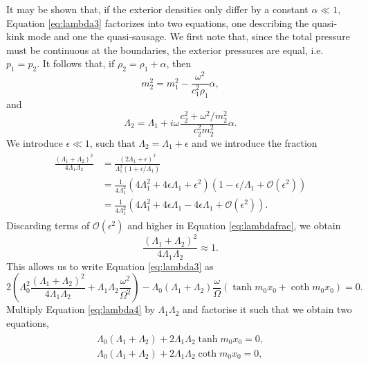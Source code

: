 It may be shown that, if the exterior densities only differ by a constant $\alpha \ll 1$, Equation \eqref{eq:lambda3} factorizes into two equations, one describing the quasi-kink mode and one the quasi-sausage.
We first note that, since the total pressure must be continuous at the boundaries, the exterior pressures are equal, i.e. $p_1 = p_2$.
It follows that, if $\rho_2 = \rho_1 + \alpha$, then
%
\begin{equation}
m_2^2 = m_1^2 - \frac{\omega^2}{c_1^2 \rho_1} \alpha,
\end{equation}
%
and
%
\begin{equation}
\Lambda_2 = \Lambda_1 + i \omega \frac{c_2^2 + \omega^2 / m_2^2}{c_2^2 m_2^2} \alpha.
\end{equation}
%
We introduce $\epsilon \ll 1$, such that $\Lambda_2 = \Lambda_1 + \epsilon$ and we introduce the fraction
%
\begin{align}
\begin{split}
\label{eq:lambdafrac}
\frac{(\Lambda_1 + \Lambda_2)^2}{4 \Lambda_1 \Lambda_2}
& = \frac{(2 \Lambda_1 + \epsilon)^2}{\Lambda_1^2 ( 1 + \epsilon/\Lambda_1)}
\\
& = \frac{1}{4 \Lambda_1^2} (4 \Lambda_1^2 + 4 \epsilon \Lambda_1 + \epsilon^2)
(1 - \epsilon / \Lambda_1 + \mathcal{O}(\epsilon^2))
\\
& = \frac{1}{4 \Lambda_1^2} (4 \Lambda_1^2 + 4 \epsilon \Lambda_1 - 4 \epsilon \Lambda_1 + \mathcal{O}(\epsilon^2)).
\end{split}
\end{align}
%
Discarding terms of $\mathcal{O}(\epsilon^2)$ and higher in Equation \eqref{eq:lambdafrac}, we obtain
%
\begin{equation}
\frac{(\Lambda_1 + \Lambda_2)^2}{4 \Lambda_1 \Lambda_2} \approx 1.
\end{equation}
%
This allows us to write Equation \eqref{eq:lambda3} as
%
\begin{equation}
\label{eq:lambda4}
2 \left( \Lambda_0^2 \frac{(\Lambda_1 + \Lambda_2)^2}{4 \Lambda_1 \Lambda_2} + \Lambda_1 \Lambda_2 \frac{\omega^2}{\Omega^2} \right)
- \Lambda_0 (\Lambda_1 + \Lambda_2) \frac{\omega}{\Omega} ( \tanh m_0 x_0 + \coth m_0 x_0 ) = 0.
\end{equation}
%
Multiply Equation \eqref{eq:lambda4} by $\Lambda_1 \Lambda_2$ and factorise it such that we obtain two equations,
%
\begin{align}
\begin{split}
\label{eq:lambda5}
\Lambda_0(\Lambda_1 + \Lambda_2) + 2 \Lambda_1 \Lambda_2 \tanh m_0 x_0 = 0,
\\
\Lambda_0(\Lambda_1 + \Lambda_2) + 2 \Lambda_1 \Lambda_2 \coth m_0 x_0 = 0,
\end{split}
\end{align}
